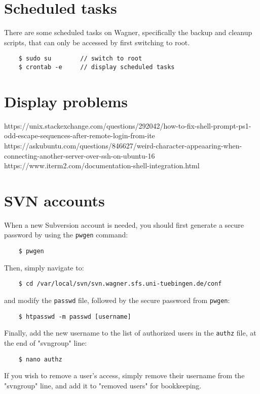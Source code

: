 \documentclass[11pt, a4paper]{article}
\begin{document}
\section{Scheduled tasks}

There are some scheduled tasks on Wagner, specifically the backup and cleanup scripts, that can only be accessed by first switching to root.

\begin{verbatim}
    $ sudo su        // switch to root
    $ crontab -e     // display scheduled tasks
\end{verbatim}



\section{Display problems}

https://unix.stackexchange.com/questions/292042/how-to-fix-shell-prompt-ps1-odd-escape-sequences-after-remote-login-from-ite \\

\noindent
https://askubuntu.com/questions/846627/weird-character-appeaaring-when-connecting-another-server-over-ssh-on-ubuntu-16 \\

\noindent
https://www.iterm2.com/documentation-shell-integration.html

\section{SVN accounts}

When a new Subversion account is needed, you should first generate a secure password by using the \verb|pwgen| command:

\begin{verbatim}
    $ pwgen
\end{verbatim}

\noindent
Then, simply navigate to:

\begin{verbatim}
    $ cd /var/local/svn/svn.wagner.sfs.uni-tuebingen.de/conf
\end{verbatim}

\noindent
and modify the \verb|passwd| file, followed by the secure password from \verb|pwgen|:

\begin{verbatim} 
    $ htpasswd -m passwd [username]
\end{verbatim}

\noindent
Finally, add the new username to the list of authorized users in the \verb|authz| file, at the end of "svngroup" line:

\begin{verbatim}
    $ nano authz
\end{verbatim}

\noindent
If you wish to remove a user's access, simply remove their username from the "svngroup" line, and add it to "removed users" for bookkeeping.
\end{document}

